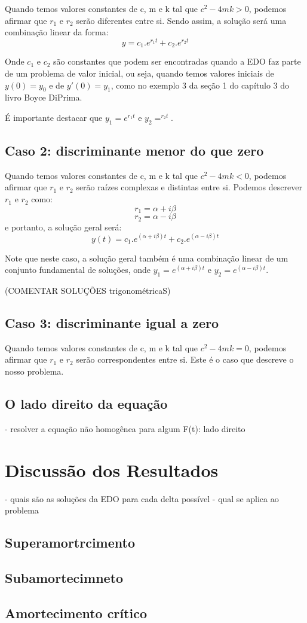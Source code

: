 \documentclass[]{article}
\begin{document}
Quando temos valores constantes de c, m e k tal que $c^2 - 4mk > 0$, podemos afirmar que 
$r_1$ e $r_2$ serão diferentes entre si. Sendo assim, a solução será uma combinação linear da forma:
\[y = c_1.e^{r_1t} + c_2.e^{r_2t}\]

Onde $c_1$ e $c_2$ são constantes que podem ser encontradas quando a EDO faz parte de um problema
de valor inicial, ou seja, quando temos valores iniciais de $y(0)=y_0$ e de $y'(0)=y_1$, como no 
exemplo 3 da seção 1 do capítulo 3 do livro Boyce DiPrima. 

É importante destacar que  $y_1 = e^{r_1t}$ e $y_2 = ^{r_2t}$.

\subsection{Caso 2: discriminante menor do que zero}

Quando temos valores constantes de c, m e k tal que $c^2 - 4mk < 0$, podemos afirmar que 
$r_1$ e $r_2$ serão raízes complexas e distintas entre si. Podemos descrever $r_1$ e $r_2$ como:
\[ r_1 = \alpha + i\beta\] 
\[ r_2 = \alpha - i\beta\] 
e portanto, a solução geral será:
\[ y(t) = c_1.e^{(\alpha + i\beta)t} + c_2.e^{(\alpha - i\beta)t}\]

Note que neste caso, a solução geral também é uma combinação linear de um conjunto fundamental de soluções,
onde $y_1 = e^{(\alpha + i\beta)t}$ e $y_2 = e^{(\alpha - i\beta)t}$.

(COMENTAR SOLUÇÕES trigonométricaS)

\subsection{Caso 3: discriminante igual a zero}

Quando temos valores constantes de c, m e k tal que $c^2 - 4mk = 0$, podemos afirmar que 
$r_1$ e $r_2$ serão correspondentes entre si. Este é o caso que descreve o nosso problema.



\subsection{O lado direito da equação}

- resolver a equação não homogênea para algum F(t): lado direito

\pagebreak

\section{Discussão dos Resultados}

- quais são as soluções da EDO para cada delta possível
- qual se aplica ao problema

\subsection{Superamortrcimento}

\subsection{Subamortecimneto}

\subsection{Amortecimento crítico}
\end{document}
